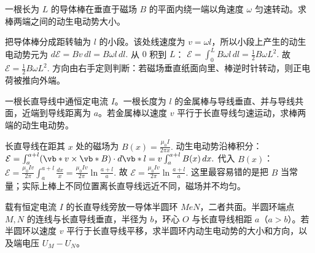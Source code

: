 \documentclass[lang=cn,11pt]{elegantbook}
\begin{document}
\begin{exercise}[转动导体棒两端的动生电动势]
一根长为 \(L\) 的导体棒在垂直于磁场 \(B\) 的平面内绕一端以角速度 \(\omega\) 匀速转动。求棒两端之间的动生电动势大小。
\end{exercise}

\begin{solution}
把导体棒分成距转轴为 \(l\) 的小段。该处线速度为 \(v=\omega l\)，所以小段上产生的动生电动势元为
 \(d\mathcal{E}=Bv\,dl=B\omega l\,dl.\) 
从 \(0\) 积到 \(L\)：
 \(\mathcal{E}=\int_0^L B\omega l\,dl =\frac12 B\omega L^2.\) 
故
 \(\boxed{ \mathcal{E}=\frac12 B\omega L^2 }.\) 
方向由右手定则判断：若磁场垂直纸面向里、棒逆时针转动，则正电荷被推向外端。
\end{solution}

\begin{exercise}[长直导线旁移动金属棒的动生电动势]
一根长直导线中通恒定电流 \(I\)。一根长度为 \(l\) 的金属棒与导线垂直、并与导线共面，近端到导线距离为 \(a\)。若金属棒以速度 \(v\) 平行于长直导线匀速运动，求棒两端的动生电动势。
\end{exercise}

\begin{solution}
长直导线在距其 \(x\) 处的磁场为
 \(B(x)=\frac{\mu_0I}{2\pi x}.\) 
动生电动势沿棒积分：
 \(\mathcal{E}=\int_a^{a+l}(\vb*{v}\times\vb*{B})\cdot d\vb*{l} =v\int_a^{a+l}B(x)\,dx.\) 
代入 \(B(x)\)：
 \(\mathcal{E} =\frac{\mu_0Iv}{2\pi}\int_a^{a+l}\frac{dx}{x} =\frac{\mu_0Iv}{2\pi}\ln\frac{a+l}{a}.\) 
故
 \(\boxed{ \mathcal{E}=\frac{\mu_0Iv}{2\pi}\ln\frac{a+l}{a} }.\) 
这里最容易错的是把 \(B\) 当常量；实际上棒上不同位置离长直导线远近不同，磁场并不均匀。
\end{solution}

\begin{exercise}
载有恒定电流 \(I\) 的长直导线旁放一导体半圆环 \(MeN\)，二者共面。半圆环端点 \(M,N\) 的连线与长直导线垂直，半径为 \(b\)，环心 \(O\) 与长直导线相距 \(a\)（\(a>b\)）。若半圆环以速度 \(v\) 平行于长直导线平移，求半圆环内动生电动势的大小和方向，以及端电压 \(U_M-U_N\)。
\end{exercise}
\end{document}
